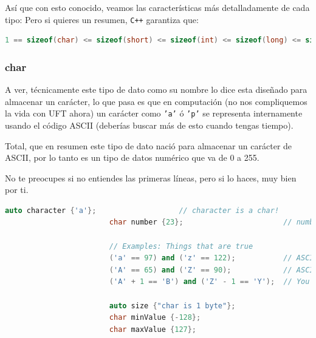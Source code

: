 \documentclass[12pt, fleqn]{report}                             %
\theoremstyle{break}                                            %
\newcommand{\textCode}[1]  { \texttt{#1} }                      %
\newcommand{\Cpp}{\ignorespaces\textCode{C++}}                  %
\begin{document}
                Así que con esto conocido, veamos las características más detalladamente de cada tipo:
                Pero si quieres un resumen, \Cpp garantiza que:
                \begin{lstlisting}[language=C++, gobble=20]
                    1 == sizeof(char) <= sizeof(short) <= sizeof(int) <= sizeof(long) <= sizeof(long long);
                \end{lstlisting}


                \subsubsection{char}

                    A ver, técnicamente este tipo de dato como su nombre lo dice esta diseñado para almacenar
                    un carácter, lo que pasa es que en computación (no nos compliquemos la vida con UFT ahora)
                    un carácter como \textCode{'a'} ó \textCode{'p'} se representa internamente usando el código
                    ASCII (deberías buscar más de esto cuando tengas tiempo).
                    
                    Total, que en resumen este tipo de dato nació para almacenar un carácter de ASCII, 
                    por lo tanto es un tipo de datos numérico que va de 0 a 255.

                    No te preocupes si no entiendes las primeras líneas, pero si lo haces, muy bien por ti.
                    \begin{lstlisting}[language=C++, gobble=24]
                        auto character {'a'};                   // character is a char!
                        char number {23};                       // number is a char!

                        // Examples: Things that are true
                        ('a' == 97) and ('z' == 122);           // ASCII is just numbers
                        ('A' == 65) and ('Z' == 90);            // ASCII is just numbers
                        ('A' + 1 == 'B') and ('Z' - 1 == 'Y');  // You can do arithmetic

                        auto size {"char is 1 byte"};
                        char minValue {-128};
                        char maxValue {127};
                    \end{lstlisting}
\end{document}
